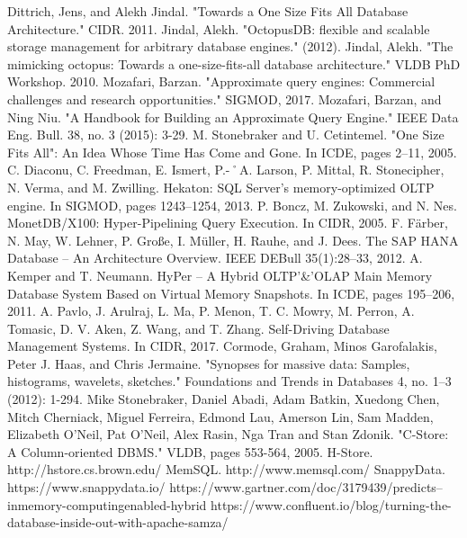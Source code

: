 \documentclass[10pt, conference, compsocconf]{IEEEtran}
\begin{document}
\begin{thebibliography}{1}

Dittrich, Jens, and Alekh Jindal. "Towards a One Size Fits All Database Architecture." CIDR. 2011.
Jindal, Alekh. "OctopusDB: flexible and scalable storage management for arbitrary database engines." (2012).
Jindal, Alekh. "The mimicking octopus: Towards a one-size-fits-all database architecture." VLDB PhD Workshop. 2010.
Mozafari, Barzan. "Approximate query engines: Commercial challenges and research opportunities." SIGMOD, 2017.
Mozafari, Barzan, and Ning Niu. "A Handbook for Building an Approximate Query Engine." IEEE Data Eng.
Bull. 38, no. 3 (2015): 3-29.
M. Stonebraker and U. Cetintemel. "One Size Fits All": An Idea Whose Time Has Come and Gone. In ICDE, pages 2–11, 2005.
C. Diaconu, C. Freedman, E. Ismert, P.-˚A. Larson, P. Mittal, R. Stonecipher, N. Verma, and M. Zwilling. Hekaton: SQL Server’s memory-optimized OLTP engine. In SIGMOD, pages 1243–1254, 2013.
P. Boncz, M. Zukowski, and N. Nes. MonetDB/X100: Hyper-Pipelining Query Execution. In CIDR, 2005.
F. Färber, N. May, W. Lehner, P. Große, I. Müller, H. Rauhe, and J. Dees. The SAP HANA Database – An Architecture Overview. IEEE DEBull 35(1):28–33, 2012.
A. Kemper and T. Neumann. HyPer – A Hybrid OLTP'\&'OLAP Main Memory Database System Based on Virtual Memory Snapshots. In ICDE, pages 195–206, 2011.
A. Pavlo, J. Arulraj, L. Ma, P. Menon, T. C. Mowry, M. Perron, A. Tomasic, D. V. Aken, Z. Wang, and T. Zhang. Self-Driving Database Management Systems. In CIDR, 2017.
Cormode, Graham, Minos Garofalakis, Peter J. Haas, and Chris Jermaine. "Synopses for massive data: Samples, histograms, wavelets, sketches." Foundations and Trends in Databases 4, no. 1–3 (2012): 1-294.
Mike Stonebraker, Daniel Abadi, Adam Batkin, Xuedong Chen, Mitch Cherniack, Miguel Ferreira, Edmond Lau, Amerson Lin, Sam Madden, Elizabeth O'Neil, Pat O'Neil, Alex Rasin, Nga Tran and Stan Zdonik. "C-Store: A Column-oriented DBMS." VLDB, pages 553-564, 2005. 
H-Store. http://hstore.cs.brown.edu/
MemSQL. http://www.memsql.com/
SnappyData. https://www.snappydata.io/
https://www.gartner.com/doc/3179439/predicts--inmemory-computingenabled-hybrid
https://www.confluent.io/blog/turning-the-database-inside-out-with-apache-samza/

\end{thebibliography}
\end{document}

